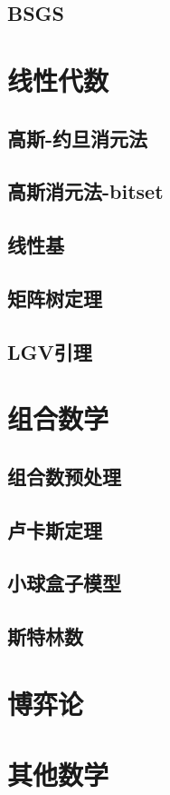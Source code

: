 \documentclass{article}
\begin{document}
\subsection{BSGS}

\section{线性代数}
\subsection{高斯-约旦消元法}
\subsection{高斯消元法-bitset}
\subsection{线性基}
\subsection{矩阵树定理}
\subsection{LGV引理}

\section{组合数学}
\subsection{组合数预处理}
\subsection{卢卡斯定理}
\subsection{小球盒子模型}
\subsection{斯特林数}

\section{博弈论}

\section{其他数学}
\end{document}
